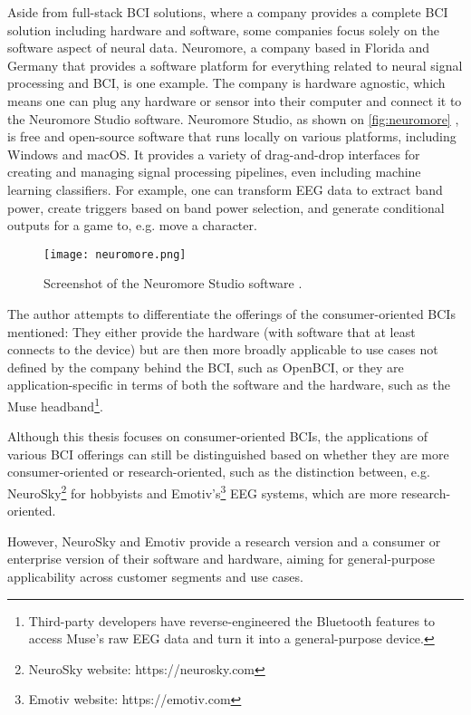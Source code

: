 Aside from full-stack BCI solutions, where a company provides a complete BCI solution including hardware and software, some companies focus solely on the software aspect of neural data. Neuromore, a company based in Florida and Germany that provides a software platform for everything related to neural signal processing and BCI, is one example. The company is hardware agnostic, which means one can plug any hardware or sensor into their computer and connect it to the Neuromore Studio software. Neuromore Studio, as shown on \autoref{fig:neuromore} , is free and open-source software that runs locally on various platforms, including Windows and macOS. It provides a variety of drag-and-drop interfaces for creating and managing signal processing pipelines, even including machine learning classifiers. For example, one can transform EEG data to extract band power, create triggers based on band power selection, and generate conditional outputs for a game to, e.g. move a character.

\begin{figure}[ht]
  \centering
  \texttt{[image: neuromore.png]}
  \caption{Screenshot of the Neuromore Studio software \citep{neuromore_neuromore_nodate}.}
  \label{fig:neuromore}
\end{figure}

The author attempts to differentiate the offerings of the consumer-oriented BCIs mentioned: They either provide the hardware (with software that at least connects to the device) but are then more broadly applicable to use cases not defined by the company behind the BCI, such as OpenBCI, or they are application-specific in terms of both the software and the hardware, such as the Muse headband\footnote{Third-party developers have reverse-engineered the Bluetooth features to access Muse's raw EEG data and turn it into a general-purpose device.}.

Although this thesis focuses on consumer-oriented BCIs, the applications of various BCI offerings can still be distinguished based on whether they are more consumer-oriented or research-oriented, such as the distinction between, e.g. NeuroSky\footnote{NeuroSky website: https://neurosky.com} for hobbyists and Emotiv's\footnote{Emotiv website: https://emotiv.com} EEG systems, which are more research-oriented.

However, NeuroSky and Emotiv provide a research version and a consumer or enterprise version of their software and hardware, aiming for general-purpose applicability across customer segments and use cases.

